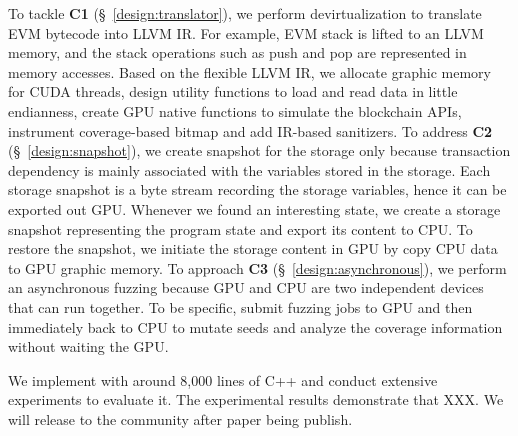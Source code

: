 

To tackle \textbf{C1} (\S~\ref{design:translator}), we perform devirtualization to translate EVM bytecode into LLVM IR. For example, EVM stack is lifted to an LLVM memory, and the stack operations such as push and pop are represented in memory accesses. Based on the flexible LLVM IR, we allocate graphic memory for CUDA threads, design utility functions to load and read data in little endianness, create GPU native functions to simulate the blockchain APIs, instrument coverage-based bitmap and add IR-based sanitizers.
%
To address \textbf{C2} (\S~\ref{design:snapshot}), we create snapshot for the storage only because transaction dependency is mainly associated with the variables stored in the storage. 
Each storage snapshot is a byte stream recording the storage variables, hence it can be exported out GPU. 
Whenever we found an interesting state, we create a storage snapshot representing the program state and export its content to CPU. To restore the snapshot, we initiate the storage content in GPU by copy CPU data to GPU graphic memory.
%
To approach \textbf{C3} (\S~\ref{design:asynchronous}), we perform an asynchronous fuzzing because GPU and CPU are two independent devices that can run together. 
To be specific, {\tool} submit fuzzing jobs to GPU and then immediately back to CPU to mutate seeds and analyze the coverage information without waiting the GPU. 


We implement {\tool} with around 8,000 lines of C++ and conduct extensive experiments to evaluate it. 
The experimental results demonstrate that {\tool} XXX. 
We will release {\tool} to the community after paper being publish.



